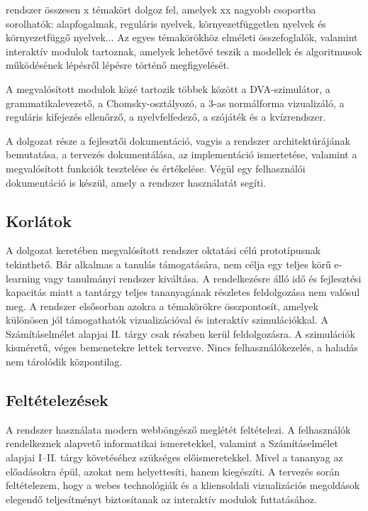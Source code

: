 \documentclass[12pt,a4paper]{report}
\begin{document}
rendszer összesen x témakört dolgoz fel, amelyek xx nagyobb csoportba sorolhatók: 
alapfogalmak, reguláris nyelvek, környezetfüggetlen nyelvek és környezetfüggő nyelvek...
 Az egyes témakörökhöz elméleti összefoglalók, valamint interaktív modulok tartoznak, 
 amelyek lehetővé teszik a modellek és algoritmusok működésének lépésről lépésre történő megfigyelését.
 
A megvalósított modulok közé tartozik többek között a DVA-szimulátor, a grammatikalevezető, a Chomsky-osztályozó, a 3-as normálforma vizualizáló, a reguláris kifejezés ellenőrző, a nyelvfelfedező, a szójáték és a kvízrendszer.


A dolgozat része a fejlesztői dokumentáció, vagyis
a rendszer architektúrájának bemutatása, a tervezés
dokumentálása, az implementáció ismertetése, valamint a megvalósított
funkciók tesztelése és értékelése. Végül egy felhasználói dokumentáció
is készül, amely a rendszer használatát segíti.

\subsection{Korlátok}

A dolgozat keretében megvalósított rendszer oktatási célú
prototípusnak tekinthető. Bár alkalmas a tanulás támogatására, nem
célja egy teljes körű e-learning vagy tanulmányi rendszer kiváltása.
A rendelkezésre álló idő és fejlesztési kapacitás miatt a tantárgy teljes
 tananyagának részletes feldolgozása nem valósul meg. 
 A rendszer elsősorban azokra a témakörökre összpontosít, amelyek különösen jól támogathatók vizualizációval
  és interaktív szimulációkkal.
A Számításelmélet alapjai II. tárgy csak részben kerül feldolgozásra.
A szimulációk kisméretű, véges bemenetekre lettek tervezve.
Nincs felhasználókezelés, a haladás nem tárolódik központilag.

\subsection{Feltételezések}

A rendszer használata modern webböngésző meglétét feltételezi. A
felhasználók rendelkeznek alapvető informatikai ismeretekkel, valamint
a Számításelmélet alapjai I--II. tárgy követéséhez szükséges
előismeretekkel. Mivel a tananyag az előadásokra épül, azokat nem
helyettesíti, hanem kiegészíti. A tervezés során feltételezem, hogy a webes
technológiák és a kliensoldali vizualizációs megoldások elegendő
teljesítményt biztosítanak az interaktív modulok futtatásához.
\end{document}
